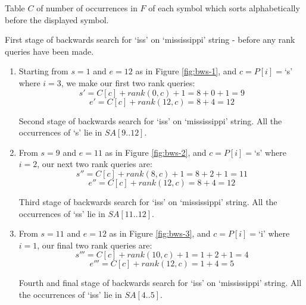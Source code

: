			{Table $C$ of number of occurrences in $F$ of each symbol which
			sorts alphabetically before the displayed symbol.}

\clearpage			
			{First stage of backwards search for `iss' on `mississippi'
			 string - before any rank queries have been made.}

\begin{enumerate}
	\item
		Starting from $s = 1$ and $e = 12$ as in Figure \ref{fig:bws-1},
		and $c = P[i] = $`s' where $i = 3$, we make our first two rank queries:
			$$s' = C[c] + rank(0, c) + 1 = 8 + 0 + 1 = 9$$
			$$e' = C[c] + rank(12, c) = 8 + 4 = 12$$
		
				{Second stage of backwards search for `iss' on `mississippi'
				string. All the occurrences of `s' lie in $SA[9..12]$.}
\clearpage				
	\item
		From $s = 9$ and $e = 11$ as in Figure \ref{fig:bws-2},
		and $c = P[i] = $`s' where $i = 2$, our next two rank queries are:
			$$s'' = C[c] + rank(8, c) + 1 = 8 + 2 + 1 = 11$$
			$$e'' = C[c] + rank(12, c) = 8 + 4 = 12$$
	
			
				{Third stage of backwards search for `iss' on `mississippi'
				string. All the occurrences of `ss' lie in $SA[11..12]$.}
	
	\item
		From $s = 11$ and $e = 12$ as in Figure \ref{fig:bws-3},
		and $c = P[i] = $`i' where $i = 1$, our final two rank queries are:
			$$s''' = C[c] + rank(10, c) + 1 = 1 + 2 + 1 = 4$$
			$$e''' = C[c] + rank(12, c) = 1 + 4 = 5$$
			
			
				{Fourth and final stage of backwards search for `iss' on
				`mississippi' string. All the occurrences of `iss' lie in
				$SA[4..5]$.}
				
\end{enumerate}
